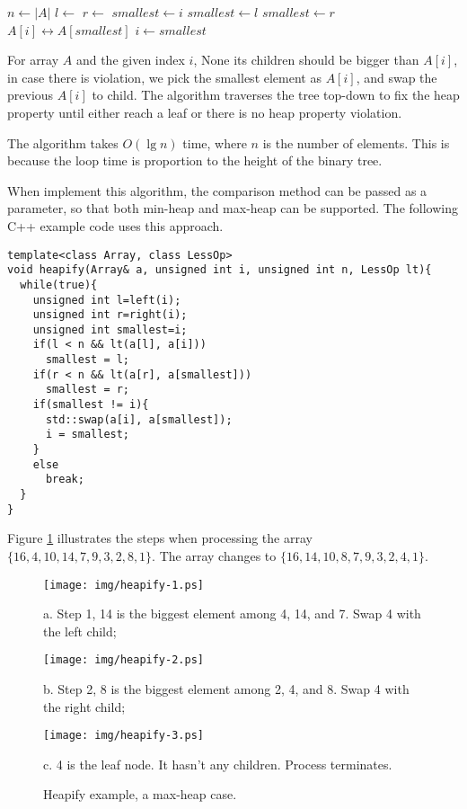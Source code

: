 \documentclass{article}
\begin{document}
\begin{algorithmic}[1]
  \State $n \gets |A|$
  \Loop
    \State $l \gets$ 
    \State $r \gets$ 
    \State $smallest \gets i$
      \State $smallest \gets l$
    \EndIf
      \State $smallest \gets r$
    \EndIf
      \State {} $A[i] \leftrightarrow A[smallest]$
      \State $i \gets smallest$
    \Else
      \State \Return
    \EndIf
  \EndLoop
\EndFunction
\end{algorithmic}

For array $A$ and the given index $i$, None its children
should be bigger than $A[i]$, in case there is violation, we pick the smallest
element as $A[i]$, and swap the previous $A[i]$ to child.
The algorithm traverses the tree top-down to fix the heap property
until either reach a leaf or there is no heap property violation.

The  algorithm takes $O(\lg n)$ time, where
$n$ is the number of elements. This
is because the loop time is proportion to the height of the binary tree.

When implement this algorithm, the comparison method can be passed as
a parameter, so that both min-heap and max-heap can be supported.
The following C++ example code uses this approach.

\begin{lstlisting}
template<class Array, class LessOp>
void heapify(Array& a, unsigned int i, unsigned int n, LessOp lt){
  while(true){
    unsigned int l=left(i);
    unsigned int r=right(i);
    unsigned int smallest=i;
    if(l < n && lt(a[l], a[i]))
      smallest = l;
    if(r < n && lt(a[r], a[smallest]))
      smallest = r;
    if(smallest != i){
      std::swap(a[i], a[smallest]);
      i = smallest;
    }
    else
      break;
  }
}
\end{lstlisting}

Figure \ref{fig:heapify} illustrates the steps when  processing the
array $\{16, 4, 10, 14, 7, 9, 3, 2, 8, 1\}$. The array changes to
$\{16, 14, 10, 8, 7, 9, 3, 2, 4, 1\}$.

\begin{figure}[htbp]
  \begin{center}
    \texttt{[image: img/heapify-1.ps]}

    a. Step 1, 14 is the biggest element among 4, 14, and 7. Swap 4 with the left child;

    \texttt{[image: img/heapify-2.ps]}

    b. Step 2, 8 is the biggest element among 2, 4, and 8. Swap 4 with the right child;

    \texttt{[image: img/heapify-3.ps]}

    c. 4 is the leaf node. It hasn't any children. Process terminates.
    \caption{Heapify example, a max-heap case.} \label{fig:heapify}
  \end{center}
\end{figure}
\end{document}
